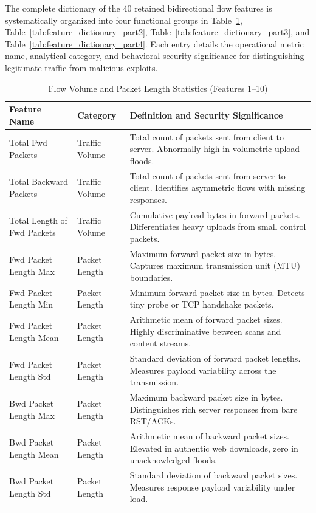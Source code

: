 \documentclass[12pt,a4paper]{report}
\begin{document}
The complete dictionary of the 40 retained bidirectional flow features is systematically organized into four functional groups in Table~\ref{tab:feature_dictionary_part1}, Table~\ref{tab:feature_dictionary_part2}, Table~\ref{tab:feature_dictionary_part3}, and Table~\ref{tab:feature_dictionary_part4}. Each entry details the operational metric name, analytical category, and behavioral security significance for distinguishing legitimate traffic from malicious exploits.

\begin{table}[H]
\centering
\small
\renewcommand{\arraystretch}{1.15}
\begin{tabularx}{\textwidth}{|p{4.3cm}|p{2.8cm}|X|}
\hline
\textbf{Feature Name} & \textbf{Category} & \textbf{Definition and Security Significance} \\
\hline
Total Fwd Packets & Traffic Volume & Total count of packets sent from client to server. Abnormally high in volumetric upload floods. \\
\hline
Total Backward Packets & Traffic Volume & Total count of packets sent from server to client. Identifies asymmetric flows with missing responses. \\
\hline
Total Length of Fwd Packets & Traffic Volume & Cumulative payload bytes in forward packets. Differentiates heavy uploads from small control packets. \\
\hline
Fwd Packet Length Max & Packet Length & Maximum forward packet size in bytes. Captures maximum transmission unit (MTU) boundaries. \\
\hline
Fwd Packet Length Min & Packet Length & Minimum forward packet size in bytes. Detects tiny probe or TCP handshake packets. \\
\hline
Fwd Packet Length Mean & Packet Length & Arithmetic mean of forward packet sizes. Highly discriminative between scans and content streams. \\
\hline
Fwd Packet Length Std & Packet Length & Standard deviation of forward packet lengths. Measures payload variability across the transmission. \\
\hline
Bwd Packet Length Max & Packet Length & Maximum backward packet size in bytes. Distinguishes rich server responses from bare RST/ACKs. \\
\hline
Bwd Packet Length Mean & Packet Length & Arithmetic mean of backward packet sizes. Elevated in authentic web downloads, zero in unacknowledged floods. \\
\hline
Bwd Packet Length Std & Packet Length & Standard deviation of backward packet sizes. Measures response payload variability under load. \\
\hline
\end{tabularx}
\caption{Flow Volume and Packet Length Statistics (Features 1--10)}
\label{tab:feature_dictionary_part1}
\end{table}
\end{document}
